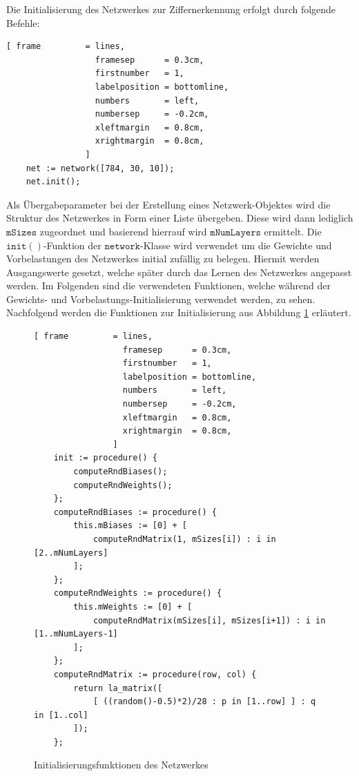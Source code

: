 \noindent
Die Initialisierung des Netzwerkes zur Ziffernerkennung erfolgt durch folgende Befehle:
\begin{Verbatim}[ frame         = lines, 
                  framesep      = 0.3cm, 
                  firstnumber   = 1,
                  labelposition = bottomline,
                  numbers       = left,
                  numbersep     = -0.2cm,
                  xleftmargin   = 0.8cm,
                  xrightmargin  = 0.8cm,
                ]
    net := network([784, 30, 10]);
    net.init();
\end{Verbatim}
Als Übergabeparameter bei der Erstellung eines Netzwerk-Objektes wird die Struktur des Netzwerkes in Form einer Liste übergeben. Diese wird dann lediglich $\mathtt{mSizes}$ zugeordnet und basierend hierrauf wird $\mathtt{mNumLayers}$ ermittelt.
Die $\mathtt{init()}$-Funktion der $\mathtt{network}$-Klasse wird verwendet um die Gewichte und Vorbelastungen des Netzwerkes initial zufällig zu belegen. Hiermit werden Ausgangswerte gesetzt, welche später durch das Lernen des Netzwerkes angepasst werden.
Im Folgenden sind die verwendeten Funktionen, welche während der Gewichts- und Vorbelastungs-Initialisierung verwendet werden, zu sehen. Nachfolgend werden die Funktionen zur Initialisierung aus Abbildung \ref{fig:init} erläutert.
\begin{figure}
\begin{Verbatim}[ frame         = lines, 
                  framesep      = 0.3cm, 
                  firstnumber   = 1,
                  labelposition = bottomline,
                  numbers       = left,
                  numbersep     = -0.2cm,
                  xleftmargin   = 0.8cm,
                  xrightmargin  = 0.8cm,
                ]
    init := procedure() {
        computeRndBiases();
        computeRndWeights();
    };
    computeRndBiases := procedure() {
        this.mBiases := [0] + [ 
            computeRndMatrix(1, mSizes[i]) : i in [2..mNumLayers] 
        ];
    };
    computeRndWeights := procedure() {
        this.mWeights := [0] + [ 
            computeRndMatrix(mSizes[i], mSizes[i+1]) : i in [1..mNumLayers-1] 
        ];
    };
    computeRndMatrix := procedure(row, col) {
        return la_matrix([
            [ ((random()-0.5)*2)/28 : p in [1..row] ] : q in [1..col]
        ]);
    };
\end{Verbatim}
\vspace*{-0.3cm}
\caption{Initialisierungsfunktionen des Netzwerkes}
\label{fig:init}
\end{figure}

